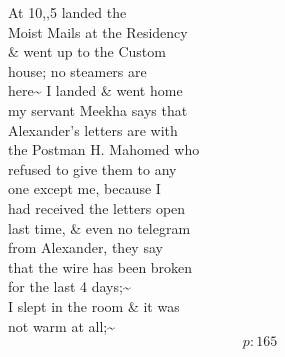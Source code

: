 \documentclass{report}
\begin{document}
	\par{
 	At 10,,5 landed the\ \\Moist Mails at the Residency\ \\\& went up to the Custom\ \\house; no steamers are\ \\here\~{} I landed \& went home\ \\my servant Meekha says that\ \\Alexander's letters are with\ \\the Postman H. Mahomed who\ \\refused to give them to any\ \\one except me, because I\ \\had received the letters open\ \\last time, \& even no telegram\ \\from Alexander, they say\ \\that the wire has been broken\ \\for the last 4 days;\~{}\ \\I slept in the room \& it was\ \\not warm at all;\~{}\ \\
  \[p: 165 \]

	}





\end{document}
